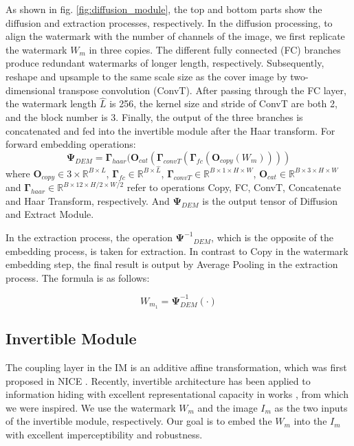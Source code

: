 \documentclass[sigconf]{acmart}
\begin{document}
As shown in fig. \ref{fig:diffusion_module}, the top and bottom parts show the diffusion and extraction processes, respectively.
In the diffusion processing, to align the watermark with the number of channels of the image, we first replicate the watermark $W_{m}$ in three copies. The different fully connected (FC) branches produce redundant watermarks of longer length, respectively. Subsequently, reshape and upsample to the same scale size as the cover image by two-dimensional transpose convolution (ConvT). After passing through the FC layer, the watermark length $\hat{L}$ is 256, the kernel size and stride of ConvT are both 2, and the block number is 3. Finally, the output of the three branches is concatenated and fed into the invertible module after the Haar transform. For forward embedding operations:
\begin{equation}
    \mathbf{\Psi}_{DEM} = \mathbf{\Gamma}_{haar}(\mathbf{O}_{cat}(\mathbf{\Gamma}_{convT}(\mathbf{\Gamma}_{fc}(\mathbf{O}_{copy}(W_{m}))))
    \label{Inv}
\end{equation}
where ${\mathbf{O}}_{copy}\in 3\times\mathbb{R}^{B\times L}$,
          ${\mathbf{\Gamma}}_{fc}\in \mathbb{R}^{B\times \hat{L}}$,
           ${\mathbf{\Gamma}}_{convT}\in \mathbb{R}^{B\times 1\times H\times W}$,
            ${\mathbf{O}}_{cat}\in \mathbb{R}^{B\times 3\times H\times W}$ and
             ${\mathbf{\Gamma}}_{haar}\in \mathbb{R}^{B\times 12\times H/2\times W/2}$
refer to operations Copy, FC, ConvT, Concatenate and Haar Transform, respectively.
And ${\mathbf{\Psi}}_{DEM}$ is the output tensor of Diffusion and Extract Module.

In the extraction process, the operation ${\mathbf{\Psi}^{-1}}_{DEM}$, which is the opposite of the embedding process, is taken for extraction. In contrast to Copy in the watermark embedding step, the final result is output by Average Pooling in the extraction process. The formula is as follows:

\begin{equation}
   W_{{m}_{1}}=\mathbf{\Psi}^{-1}_{DEM}(\cdot)
\end{equation}




\subsection{Invertible Module}

The coupling layer in the IM is an additive affine transformation, which was first proposed in NICE \cite{dinh2014nice}.  Recently, invertible architecture has been applied to information hiding with excellent representational capacity in works \cite{xiao2020invertible,guan2022deepmih,lu2021large}, from which we were inspired.
We use the watermark $W_{m}$ and the image $I_{m}$ as the two inputs of the invertible module, respectively. Our goal is to embed the $W_{m}$ into the $I_{m}$ with excellent imperceptibility and robustness.
\end{document}
